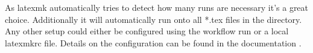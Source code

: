 \documentclass[final]{ltugboat}
\begin{document}
As latexmk automatically tries to detect how many runs are necessary it's a great choice.
Additionally it will automatically run onto all *.tex files in the directory. Any other setup could either be configured using the workflow run or a local latexmkrc file. Details on the configuration can be found in the documentation \cite{latexmk}.




\def\url{\tbsurl}


\makesignature
\end{document}
